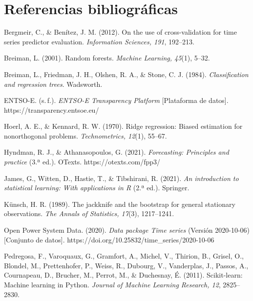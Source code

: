 \indent
\section{Referencias bibliográficas}
\leftskip 0.3in
\parindent -0.3in


Bergmeir, C., \& Benítez, J. M. (2012). On the use of cross-validation for time series predictor evaluation. \textit{Information Sciences, 191}, 192--213.

Breiman, L. (2001). Random forests. \textit{Machine Learning, 45}(1), 5--32.

Breiman, L., Friedman, J. H., Olshen, R. A., \& Stone, C. J. (1984). \textit{Classification and regression trees}. Wadsworth.

ENTSO-E. (s.\,f.). \textit{ENTSO-E Transparency Platform} [Plataforma de datos]. https://transparency.entsoe.eu/

Hoerl, A. E., \& Kennard, R. W. (1970). Ridge regression: Biased estimation for nonorthogonal problems. \textit{Technometrics, 12}(1), 55--67.

Hyndman, R. J., \& Athanasopoulos, G. (2021). \textit{Forecasting: Principles and practice} (3.ª ed.). OTexts. https://otexts.com/fpp3/

James, G., Witten, D., Hastie, T., \& Tibshirani, R. (2021). \textit{An introduction to statistical learning: With applications in R} (2.ª ed.). Springer.

Künsch, H. R. (1989). The jackknife and the bootstrap for general stationary observations. \textit{The Annals of Statistics, 17}(3), 1217--1241.

Open Power System Data. (2020). \textit{Data package Time series} (Versión 2020-10-06) [Conjunto de datos]. https://doi.org/10.25832/time\_series/2020-10-06

Pedregosa, F., Varoquaux, G., Gramfort, A., Michel, V., Thirion, B., Grisel, O., Blondel, M., Prettenhofer, P., Weiss, R., Dubourg, V., Vanderplas, J., Passos, A., Cournapeau, D., Brucher, M., Perrot, M., \& Duchesnay, É. (2011). Scikit-learn: Machine learning in Python. \textit{Journal of Machine Learning Research, 12}, 2825--2830.

\par
\leftskip 0pt
\parindent 0pt
